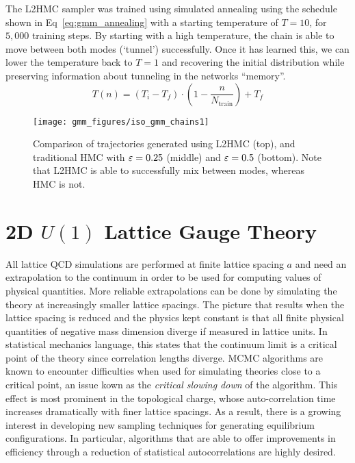 \documentclass[../main.tex]{subfiles}
\begin{document}
%
The L2HMC sampler was trained using simulated annealing using the schedule shown in Eq~\ref{eq:gmm_annealing} with a
starting temperature of $T = 10$, for $5,000$ training steps.
%
By starting with a high temperature, the chain is able to move between both modes (`tunnel') successfully.
%
Once it has learned this, we can lower the temperature back to $T = 1$ and recovering the initial distribution while
preserving information about tunneling in the networks ``memory''.
%
\begin{equation}
  T(n) = {\left(T_{i} - T_{f}\right)} \cdot {\left(1 - \frac{n}{N_{\mathrm{train}}}\right)} + T_{f}
  \label{eq:gmm_annealing}
\end{equation}
%
\begin{figure}[htbp]
    \centering
    \texttt{[image: gmm\_figures/iso\_gmm\_chains1]}
    \caption{Comparison of trajectories generated using L2HMC (top), and
        traditional HMC with ${\varepsilon} = 0.25$ (middle) and ${\varepsilon} = 0.5$ (bottom).
        Note that L2HMC is able to successfully mix between modes, whereas HMC
        is not.}\label{fig:trajectories}
\end{figure}
%
\section{2D \texorpdfstring{$U(1)$}{U(1)} Lattice Gauge Theory}  %
\label{sec:l2hmc_u1}
All lattice QCD simulations are performed at finite lattice spacing $a$ and need an extrapolation to the continuum in
order to be used for computing values of physical quantities.
%
More reliable extrapolations can be done by simulating the theory at increasingly smaller lattice spacings.
%
The picture that results when the lattice spacing is reduced and the physics kept constant is that all finite physical
quantities of negative mass dimension diverge if measured in lattice units.
%
In statistical mechanics language, this states that the continuum limit is a critical point of the theory since
correlation lengths diverge.
%
MCMC algorithms are known to encounter difficulties when used for simulating theories close to a critical point, an
issue kown as the \emph{critical slowing down} of the algorithm.
%
This effect is most prominent in the topological charge, whose auto-correlation time increases dramatically with finer
lattice spacings.
%
As a result, there is a growing interest in developing new sampling techniques for generating equilibrium
configurations. 
%
In particular, algorithms that are able to offer improvements in efficiency through a reduction of statistical
autocorrelations are highly desired. 
%
\end{document}

